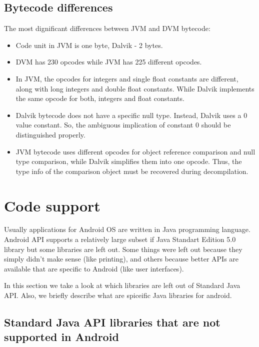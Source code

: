 \documentclass[11pt, oneside]{article}   	%
\begin{document}
\subsection{Bytecode differences}

The most dignificant differences between JVM and DVM bytecode:
\begin{itemize}
 \itemsep0pt
 \item Code unit in JVM is one byte, Dalvik - 2 bytes.
 \item DVM has 230 opcodes while JVM has 225 different opcodes.
 \item In JVM, the opcodes for integers and single float constants are different, along with long integers and double float constants. While Dalvik implements the same opcode for both, integers and float constants.
 \item Dalvik bytecode does not have a specific null type. Instead, Dalvik uses a 0 value constant. So, the ambiguous implication of constant 0 should be distinguished properly.
 \item JVM bytecode uses different opcodes for object reference comparison and null type comparison, while Dalvik simplifies them into one opcode. Thus, the type info of the comparison object must be recovered during decompilation.
\end{itemize}

\section{Code support}

Usually applications for Android OS are written in Java programming language. Android API supports a relatively large subset if Java Standart Edition 5.0 library but some libraries are left out. Some things were left out because they simply didn’t make sense (like printing), and others because better APIs are available that are specific to Android (like user interfaces). 

In this section we take a look at which libraries are left out of Standard Java API. Also, we briefly describe what are spiceific Java libraries for android.

\subsection{Standard Java API libraries that are not supported in Android}
\end{document}
